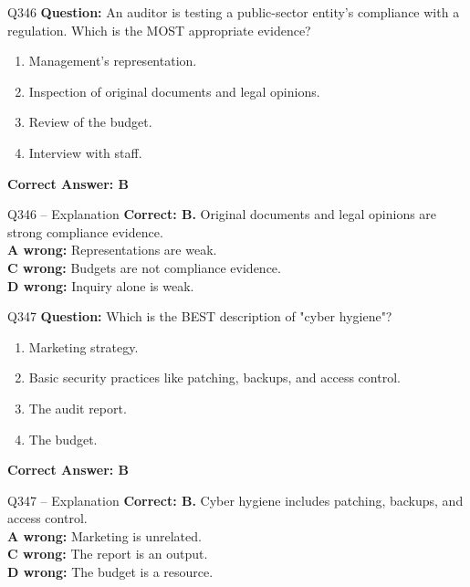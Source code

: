 \documentclass[aspectratio=169,10pt]{beamer}
\begin{document}
	\begin{frame}[t]{Q346}
		\small
		\textbf{Question:} An auditor is testing a public-sector entity's compliance with a regulation. Which is the MOST appropriate evidence?
		\begin{enumerate}[label=\Alph*.,itemsep=1pt,topsep=2pt]
			\item Management's representation.
			\item Inspection of original documents and legal opinions.
			\item Review of the budget.
			\item Interview with staff.
		\end{enumerate}
		\vspace{4pt}
		\textbf{Correct Answer: B}
	\end{frame}
	
	\begin{frame}[t]{Q346 -- Explanation}
		\small
		\textbf{Correct: B.} Original documents and legal opinions are strong compliance evidence. \\[4pt]
		\textbf{A wrong:} Representations are weak. \\[2pt]
		\textbf{C wrong:} Budgets are not compliance evidence. \\[2pt]
		\textbf{D wrong:} Inquiry alone is weak.
	\end{frame}
	
	\begin{frame}[t]{Q347}
		\small
		\textbf{Question:} Which is the BEST description of "cyber hygiene"?
		\begin{enumerate}[label=\Alph*.,itemsep=1pt,topsep=2pt]
			\item Marketing strategy.
			\item Basic security practices like patching, backups, and access control.
			\item The audit report.
			\item The budget.
		\end{enumerate}
		\vspace{4pt}
		\textbf{Correct Answer: B}
	\end{frame}
	
	\begin{frame}[t]{Q347 -- Explanation}
		\small
		\textbf{Correct: B.} Cyber hygiene includes patching, backups, and access control. \\[4pt]
		\textbf{A wrong:} Marketing is unrelated. \\[2pt]
		\textbf{C wrong:} The report is an output. \\[2pt]
		\textbf{D wrong:} The budget is a resource.
	\end{frame}
	
\end{document}
